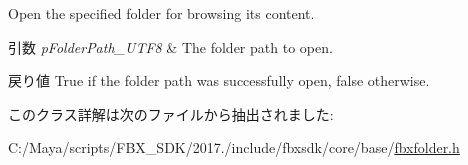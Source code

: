 Open the specified folder for browsing its content. 
\begin{DoxyParams}{引数}
{\em p\+Folder\+Path\+\_\+\+U\+T\+F8} & The folder path to open. \\
\hline
\end{DoxyParams}
\begin{DoxyReturn}{戻り値}
True if the folder path was successfully open, false otherwise. 
\end{DoxyReturn}


このクラス詳解は次のファイルから抽出されました\+:\begin{DoxyCompactItemize}
\item 
C\+:/\+Maya/scripts/\+F\+B\+X\+\_\+\+S\+D\+K/2017./include/fbxsdk/core/base/\hyperlink{fbxfolder_8h}{fbxfolder.\+h}\end{DoxyCompactItemize}
